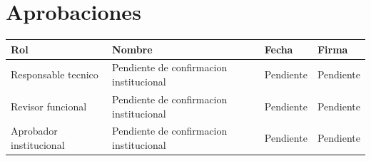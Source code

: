 \chapter*{Aprobaciones}

\begin{longtable}{p{4cm}p{4cm}p{3cm}p{3cm}}
\toprule
Rol & Nombre & Fecha & Firma \\
\midrule
Responsable tecnico & Pendiente de confirmacion institucional & Pendiente & Pendiente \\
Revisor funcional & Pendiente de confirmacion institucional & Pendiente & Pendiente \\
Aprobador institucional & Pendiente de confirmacion institucional & Pendiente & Pendiente \\
\bottomrule
\end{longtable}
